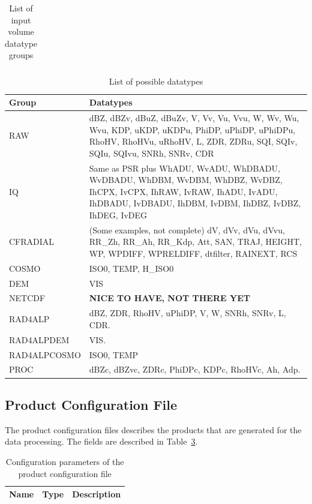 \documentclass[a4paper,11pt,pdftex,twoside]{scrartcl}
\renewcommand{\bf}{\normalfont \bfseries}
\begin{document}
{{{\begin{table}[H]
\begin{tabularx}{\textwidth}{lX}
\end{tabularx}
\caption{List of input volume datatype groups}
\label{tab_datatype_groups}
\end{table}


\begin{table}[H]
\begin{tabularx}{\textwidth}{lX}
\bf{Group} & \bf{Datatypes}\\
\hline
RAW      & dBZ, dBZv, dBuZ, dBuZv, V, Vv, Vu, Vvu, W, Wv, Wu, Wvu,
            KDP, uKDP, uKDPu, PhiDP, uPhiDP, uPhiDPu, RhoHV,
            RhoHVu, uRhoHV, L, ZDR, ZDRu, SQI, SQIv, SQIu, SQIvu, SNRh, SNRv, CDR\\
IQ        & Same as PSR plus WhADU, WvADU, WhDBADU, WvDBADU, WhDBM, WvDBM, WhDBZ, WvDBZ, IhCPX, IvCPX, IhRAW, IvRAW, IhADU, IvADU, IhDBADU, IvDBADU, IhDBM, IvDBM, IhDBZ, IvDBZ, IhDEG, IvDEG\\
CFRADIAL     & (Some examples, not complete) dV, dVv, dVu, dVvu, RR\_Zh, RR\_Ah,
            RR\_Kdp, Att, SAN, TRAJ, HEIGHT, WP, WPDIFF, WPRELDIFF,
            dtfilter, RAINEXT, RCS\\
COSMO     & ISO0, TEMP, H\_ISO0\\
DEM         & VIS\\
NETCDF    & {\bf NICE TO HAVE, NOT THERE YET} \\
RAD4ALP & dBZ, ZDR, RhoHV, uPhiDP, V, W, SNRh, SNRv, L, CDR.\\
RAD4ALPDEM & VIS.\\
RAD4ALPCOSMO & ISO0, TEMP\\
PROC & dBZc, dBZvc, ZDRc, PhiDPc, KDPc, RhoHVc, Ah, Adp.\\
\end{tabularx}
\caption{List of possible datatypes}
\label{tab_datatypes}
\end{table}


\subsection{Product Configuration File}

The product configuration files describes the products that are generated
for the data processing. The fields are described in
Table~\ref{tab_product_config_params}.

\begin{longtable}{p{}p{}p{}}
\caption{Configuration parameters of the product configuration file}\\
\label{tab_product_config_params}
\bf{Name}          & \bf{Type} & \bf{Description}\\
\hline
\endfirsthead


\end{longtable}}}}
\end{document}
